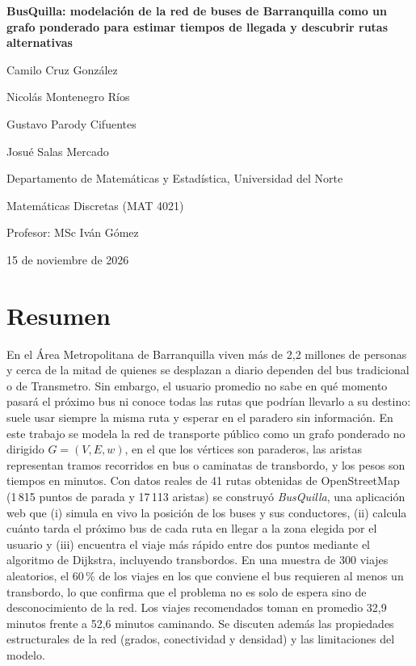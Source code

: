 \documentclass[12pt,letterpaper]{article}
\begin{document}
\begin{titlepage}
\centering
\vspace*{2cm}
{\Large\bfseries BusQuilla: modelación de la red de buses de Barranquilla como un grafo ponderado para estimar tiempos de llegada y descubrir rutas alternativas\par}
\vspace{2cm}
Camilo Cruz González\par
Nicolás Montenegro Ríos\par
Gustavo Parody Cifuentes\par
Josué Salas Mercado\par
\vspace{1cm}
Departamento de Matemáticas y Estadística, Universidad del Norte\par
\vspace{0.5cm}
Matemáticas Discretas (MAT 4021)\par
Profesor: MSc Iván Gómez\par
\vspace{0.5cm}
15 de noviembre de 2026\par
\vfill
\end{titlepage}

\section*{Resumen}
En el Área Metropolitana de Barranquilla viven más de 2,2 millones de personas y cerca de la mitad de quienes se desplazan a diario dependen del bus tradicional o de Transmetro. Sin embargo, el usuario promedio no sabe en qué momento pasará el próximo bus ni conoce todas las rutas que podrían llevarlo a su destino: suele usar siempre la misma ruta y esperar en el paradero sin información. En este trabajo se modela la red de transporte público como un grafo ponderado no dirigido $G=(V,E,w)$, en el que los vértices son paraderos, las aristas representan tramos recorridos en bus o caminatas de transbordo, y los pesos son tiempos en minutos. Con datos reales de 41 rutas obtenidas de OpenStreetMap (1\,815 puntos de parada y 17\,113 aristas) se construyó \textit{BusQuilla}, una aplicación web que (i) simula en vivo la posición de los buses y sus conductores, (ii) calcula cuánto tarda el próximo bus de cada ruta en llegar a la zona elegida por el usuario y (iii) encuentra el viaje más rápido entre dos puntos mediante el algoritmo de Dijkstra, incluyendo transbordos. En una muestra de 300 viajes aleatorios, el 60\,\% de los viajes en los que conviene el bus requieren al menos un transbordo, lo que confirma que el problema no es solo de espera sino de desconocimiento de la red. Los viajes recomendados toman en promedio 32,9 minutos frente a 52,6 minutos caminando. Se discuten además las propiedades estructurales de la red (grados, conectividad y densidad) y las limitaciones del modelo.
\end{document}
